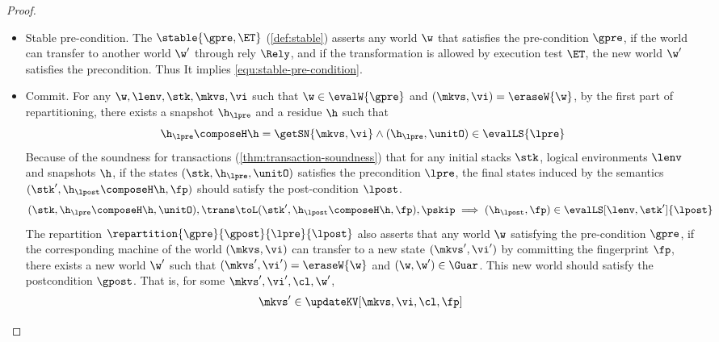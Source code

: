 \begin{proof}
\begin{itemize}
\begin{itemize}
\item Stable pre-condition.
The \( \stable{\gpre, \ET} \) (\cref{def:stable}) asserts any world \( \w \) that satisfies the pre-condition \( \gpre \), 
if the world can transfer to another world \( \w' \) through rely \( \Rely \), and if the transformation is allowed  by execution test \( \ET \), 
the new world \( \w' \) satisfies the precondition.
Thus It implies \cref{equ:stable-pre-condition}. 

\item Commit.
For any \( \w, \lenv, \stk, \mkvs, \vi \) such that \( \w \in \evalW{\gpre} \) and \( (\mkvs, \vi) = \eraseW{\w} \), by the first part of repartitioning,
there exists a snapshot \( \h_\lpre\) and a residue \( \h \) such that
\begin{equation}
\label{equ:local-pre-condition}
\h_\lpre \composeH \h = \getSN{\mkvs, \vi} \land (\h_\lpre, \unitO) \in \evalLS{\lpre}
\end{equation}
Because of the soundness for transactions (\cref{thm:transaction-soundness}) that for any initial stacks \( \stk \), logical environments \( \lenv \) and snapshots \( \h \), 
if the states \( (\stk, \h_\lpre, \unitO) \) satisfies the precondition \( \lpre \), the final states induced by the semantics \( (\stk', \h_\lpost \composeH \h, \fp) \) should satisfy the post-condition \( \lpost \).
\begin{equation}
\label{equ:local-transaction-sound}
\begin{array}{@{}l}
    (\stk, \h_\lpre \composeH \h, \unitO), \trans \toL (\stk', \h_\lpost \composeH \h, \fp), \pskip
    \implies (\h_\lpost, \fp) \in \evalLS[\lenv,\stk']{\lpost}
\end{array}
\end{equation}
The repartition \( \repartition{\gpre}{\gpost}{\lpre}{\lpost} \) also asserts that any world \( \w \) satisfying the pre-condition \( \gpre \), 
if the corresponding machine of the world \( (\mkvs, \vi) \) can transfer to a new state \(  (\mkvs', \vi') \) by committing the fingerprint \( \fp \),
there exists a new world \( \w' \) such that \( (\mkvs', \vi') = \eraseW{\w} \) and \( (\w, \w') \in \Guar \).
This new world should satisfy the postcondition \( \gpost \).
That is, for some \( \mkvs', \vi', \cl, \w' \),
\begin{equation}                                    
\label{equ:repartition}
\begin{array}{@{}l}
    \mkvs' \in \updateKV[\mkvs, \vi, \cl, \fp]

\end{array}
\end{equation}
\end{itemize}
\end{itemize}
\end{proof}
